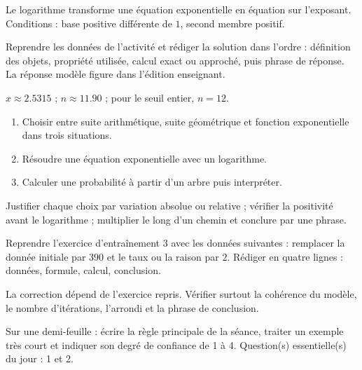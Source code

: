 \begin{summary}Le logarithme transforme une équation exponentielle en équation sur l'exposant. Conditions : base positive différente de $1$, second membre positif.\end{summary}

\begin{example}
Reprendre les données de l'activité et rédiger la solution dans l'ordre : définition des objets, propriété utilisée, calcul exact ou approché, puis phrase de réponse. La réponse modèle figure dans l'édition enseignant.
\end{example}
\begin{solution}$x\approx\num{2,5315}$ ; $n\approx\num{11,90}$ ; pour le seuil entier, $n=12$.\end{solution}

\begin{exercise}[essentiel]
\begin{enumerate}\item Choisir entre suite arithmétique, suite géométrique et fonction exponentielle dans trois situations.\item Résoudre une équation exponentielle avec un logarithme.\item Calculer une probabilité à partir d'un arbre puis interpréter.\end{enumerate}
\end{exercise}
\begin{solution}Justifier chaque choix par variation absolue ou relative ; vérifier la positivité avant le logarithme ; multiplier le long d'un chemin et conclure par une phrase.\end{solution}


\begin{homework}Reprendre l'exercice d'entraînement 3 avec les données suivantes : remplacer la donnée initiale par $390$ et le taux ou la raison par $2$. Rédiger en quatre lignes : données, formule, calcul, conclusion.\end{homework}
\begin{solution}La correction dépend de l'exercice repris. Vérifier surtout la cohérence du modèle, le nombre d'itérations, l'arrondi et la phrase de conclusion.\end{solution}

\begin{exitticket}[3 minutes]Sur une demi-feuille : écrire la règle principale de la séance, traiter un exemple très court et indiquer son degré de confiance de 1 à 4. Question(s) essentielle(s) du jour : 1 et 2.\end{exitticket}

